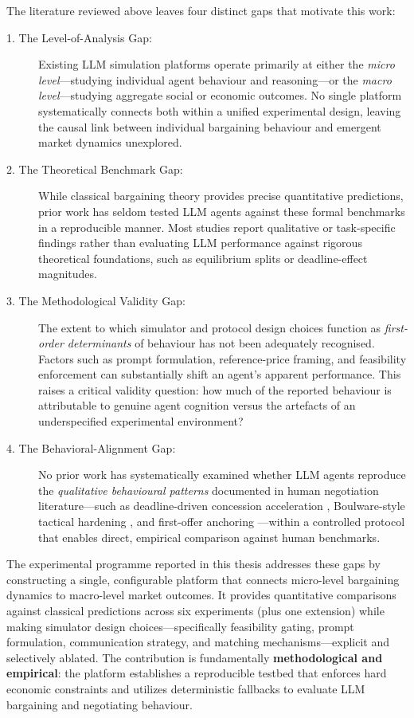 The literature reviewed above leaves four distinct gaps that motivate this work:

\begin{description}
    \item[1. The Level-of-Analysis Gap:] Existing LLM simulation platforms operate primarily at either the \textit{micro level}---studying individual agent behaviour and reasoning---or the \textit{macro level}---studying aggregate social or economic outcomes. No single platform systematically connects both within a unified experimental design, leaving the causal link between individual bargaining behaviour and emergent market dynamics unexplored.

    \item[2. The Theoretical Benchmark Gap:] While classical bargaining theory provides precise quantitative predictions, prior work has seldom tested LLM agents against these formal benchmarks in a reproducible manner. Most studies report qualitative or task-specific findings rather than evaluating LLM performance against rigorous theoretical foundations, such as  equilibrium splits or deadline-effect magnitudes.

    \item[3. The Methodological Validity Gap:] The extent to which simulator and protocol design choices function as \textit{first-order determinants} of behaviour has not been adequately recognised. Factors such as prompt formulation, reference-price framing, and feasibility enforcement can substantially shift an agent's apparent performance. This raises a critical validity question: how much of the reported behaviour is attributable to genuine agent cognition versus the artefacts of an underspecified experimental environment?

    \item[4. The Behavioral-Alignment Gap:] No prior work has systematically examined whether LLM agents reproduce the \textit{qualitative behavioural patterns} documented in human negotiation literature---such as deadline-driven concession acceleration \cite{roth1988deadline}, Boulware-style tactical hardening \cite{raiffa1982}, and first-offer anchoring \cite{galinsky2001}---within a controlled protocol that enables direct, empirical comparison against human benchmarks.
\end{description}

The experimental programme reported in this thesis addresses these gaps by constructing a single, configurable platform that connects micro-level bargaining dynamics to macro-level market outcomes. It provides quantitative comparisons against classical predictions across six experiments (plus one extension) while making simulator design choices---specifically feasibility gating, prompt formulation, communication strategy, and matching mechanisms---explicit and selectively ablated. The contribution is fundamentally \textbf{methodological and empirical}: the platform establishes a reproducible testbed that enforces hard economic constraints and utilizes deterministic fallbacks to evaluate LLM bargaining and negotiating behaviour.